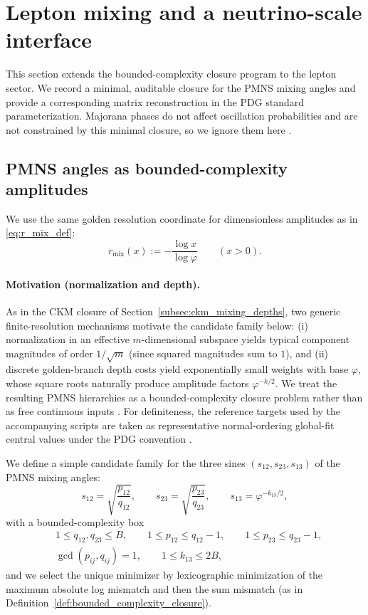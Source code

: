 \section{Lepton mixing and a neutrino-scale interface}
\label{sec:pmns_neutrino_closure}

This section extends the bounded-complexity closure program to the lepton sector.
We record a minimal, auditable closure for the PMNS mixing angles and provide a corresponding matrix reconstruction in the PDG standard parameterization.
Majorana phases do not affect oscillation probabilities and are not constrained by this minimal closure, so we ignore them here \cite{PDGRPP2024}.

\subsection{PMNS angles as bounded-complexity amplitudes}
\label{subsec:pmns_mixing_depths}

We use the same golden resolution coordinate for dimensionless amplitudes as in \eqref{eq:r_mix_def}:
\[
r_{\mathrm{mix}}(x):=-\frac{\log x}{\log\varphi}\qquad(x>0).
\]

\paragraph{Motivation (normalization and depth).}
As in the CKM closure of Section~\ref{subsec:ckm_mixing_depths}, two generic finite-resolution mechanisms motivate the candidate family below:
(i) normalization in an effective $m$-dimensional subspace yields typical component magnitudes of order $1/\sqrt{m}$ (since squared magnitudes sum to $1$), and
(ii) discrete golden-branch depth costs yield exponentially small weights with base $\varphi$, whose square roots naturally produce amplitude factors $\varphi^{-k/2}$.
We treat the resulting PMNS hierarchies as a bounded-complexity closure problem rather than as free continuous inputs \cite{PDGRPP2024,Esteban2020NuFIT}.
For definiteness, the reference targets used by the accompanying scripts are taken as representative normal-ordering global-fit central values under the PDG convention \cite{PDGRPP2024,Esteban2020NuFIT}.

We define a simple candidate family for the three sines $(s_{12},s_{23},s_{13})$ of the PMNS mixing angles:
\[
s_{12}=\sqrt{\frac{p_{12}}{q_{12}}},\qquad
s_{23}=\sqrt{\frac{p_{23}}{q_{23}}},\qquad
s_{13}=\varphi^{-k_{13}/2},
\]
with a bounded-complexity box
\[
\begin{aligned}
&1\le q_{12},q_{23}\le B,\qquad 1\le p_{12}\le q_{12}-1,\qquad 1\le p_{23}\le q_{23}-1,\\
&\gcd(p_{ij},q_{ij})=1,\qquad 1\le k_{13}\le 2B,
\end{aligned}
\]
and we select the unique minimizer by lexicographic minimization of the maximum absolute log mismatch and then the sum mismatch (as in Definition~\ref{def:bounded_complexity_closure}).

